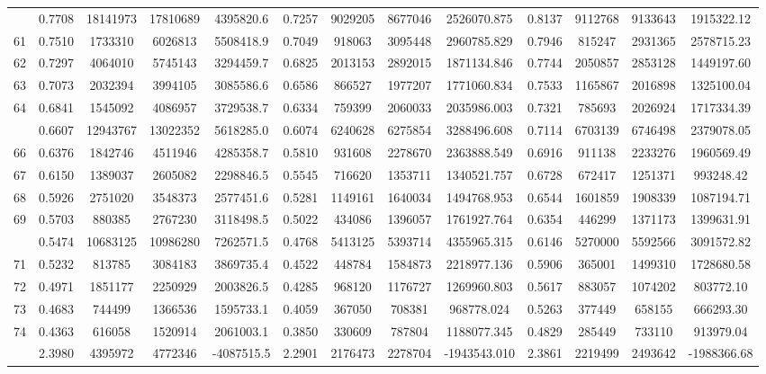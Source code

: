 \documentclass[
  12pt,
]{article}
\begin{document}
\begin{longtable}[t]{lcccccccccccc}
\addlinespace
60 & 0.7708 & 18141973 & 17810689 & 4395820.6 & 0.7257 & 9029205 & 8677046 & 2526070.875 & 0.8137 & 9112768 & 9133643 & 1915322.12\\
61 & 0.7510 & 1733310 & 6026813 & 5508418.9 & 0.7049 & 918063 & 3095448 & 2960785.829 & 0.7946 & 815247 & 2931365 & 2578715.23\\
62 & 0.7297 & 4064010 & 5745143 & 3294459.7 & 0.6825 & 2013153 & 2892015 & 1871134.846 & 0.7744 & 2050857 & 2853128 & 1449197.60\\
63 & 0.7073 & 2032394 & 3994105 & 3085586.6 & 0.6586 & 866527 & 1977207 & 1771060.834 & 0.7533 & 1165867 & 2016898 & 1325100.04\\
64 & 0.6841 & 1545092 & 4086957 & 3729538.7 & 0.6334 & 759399 & 2060033 & 2035986.003 & 0.7321 & 785693 & 2026924 & 1717334.39\\
\addlinespace
65 & 0.6607 & 12943767 & 13022352 & 5618285.0 & 0.6074 & 6240628 & 6275854 & 3288496.608 & 0.7114 & 6703139 & 6746498 & 2379078.05\\
66 & 0.6376 & 1842746 & 4511946 & 4285358.7 & 0.5810 & 931608 & 2278670 & 2363888.549 & 0.6916 & 911138 & 2233276 & 1960569.49\\
67 & 0.6150 & 1389037 & 2605082 & 2298846.5 & 0.5545 & 716620 & 1353711 & 1340521.757 & 0.6728 & 672417 & 1251371 & 993248.42\\
68 & 0.5926 & 2751020 & 3548373 & 2577451.6 & 0.5281 & 1149161 & 1640034 & 1494768.953 & 0.6544 & 1601859 & 1908339 & 1087194.71\\
69 & 0.5703 & 880385 & 2767230 & 3118498.5 & 0.5022 & 434086 & 1396057 & 1761927.764 & 0.6354 & 446299 & 1371173 & 1399631.91\\
\addlinespace
70 & 0.5474 & 10683125 & 10986280 & 7262571.5 & 0.4768 & 5413125 & 5393714 & 4355965.315 & 0.6146 & 5270000 & 5592566 & 3091572.82\\
71 & 0.5232 & 813785 & 3084183 & 3869735.4 & 0.4522 & 448784 & 1584873 & 2218977.136 & 0.5906 & 365001 & 1499310 & 1728680.58\\
72 & 0.4971 & 1851177 & 2250929 & 2003826.5 & 0.4285 & 968120 & 1176727 & 1269960.803 & 0.5617 & 883057 & 1074202 & 803772.10\\
73 & 0.4683 & 744499 & 1366536 & 1595733.1 & 0.4059 & 367050 & 708381 & 968778.024 & 0.5263 & 377449 & 658155 & 666293.30\\
74 & 0.4363 & 616058 & 1520914 & 2061003.1 & 0.3850 & 330609 & 787804 & 1188077.345 & 0.4829 & 285449 & 733110 & 913979.04\\
\addlinespace
75 & 2.3980 & 4395972 & 4772346 & -4087515.5 & 2.2901 & 2176473 & 2278704 & -1943543.010 & 2.3861 & 2219499 & 2493642 & -1988366.68\\*
\end{longtable}
\endgroup{}
\end{document}

